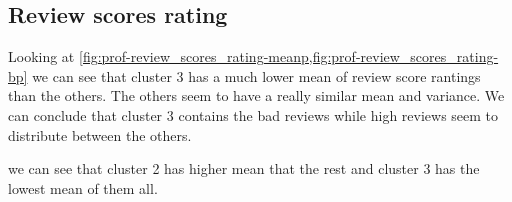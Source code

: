 

\subsection{Review scores rating}%
\label{sub:prof-review_scores_rating}


Looking at \cref{fig:prof-review_scores_rating-meanp,fig:prof-review_scores_rating-bp} we can see that cluster 3 has a much lower mean of review score rantings than the others. The others seem to have a really similar mean and variance. We can conclude that cluster 3 contains the bad reviews while high reviews seem to distribute between the others.



 we can see that cluster 2 has higher mean that the rest and
cluster 3 has the lowest mean of them all.





